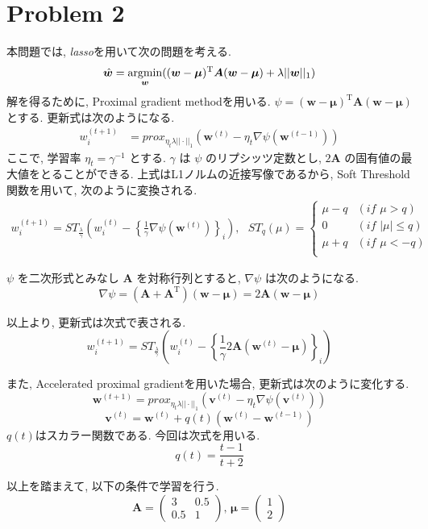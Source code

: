 \documentclass[a4paper,10pt]{jsarticle}
\newcommand{\argmin}{\mathop{\rm argmin}\limits}
\begin{document}
\section*{Problem 2}
本問題では, \textit{lasso}を用いて次の問題を考える.
\[
 \hat{\bm{w}} = \argmin_{\bm{w}}((\bm{w}-\bm{\mu})^\mathrm{T}\bm{A}(\bm{w}-\bm{\mu})
 + \lambda||\bm{w}||_1)
\]
解を得るために, Proximal gradient methodを用いる.
$\psi = (\bm{w}-\bm{\mu})^\mathrm{T}\bm{A}(\bm{w}-\bm{\mu})$ とする.
更新式は次のようになる.
\begin{align*}
 w^{(t+1)}_i
 &= prox_{\eta_t\lambda||\cdot||_1}\left(\bm{w}^{(t)}
 - \eta_t\nabla\psi(\bm{w}^{(t-1)})\right)
\end{align*}
ここで, 学習率 $\eta_t=\gamma^{-1}$ とする.
$\gamma$ は $\psi$ のリプシッツ定数とし, $2\bm{A}$ の固有値の最大値をとることができる.
上式はL1ノルムの近接写像であるから, Soft Threshold関数を用いて, 次のように変換される.
\begin{align*}
 w^{(t+1)}_i
 = ST_{\frac{\lambda}{\gamma}}\left(w^{(t)}_i
 -\left\{\frac{1}{\gamma}\nabla\psi(\bm{w}^{(t)})\right\}_i\right),
 \,\,\,\,
 ST_q(\mu) = \begin{cases}
              \mu - q &(\mathit{if} \,\, \mu > q)\\
              0 &(\mathit{if} \,\, |\mu| \leq q)\\
              \mu + q &(\mathit{if} \,\, \mu < -q)\\
             \end{cases}
\end{align*}

$\psi$ を二次形式とみなし $\bm{A}$ を対称行列とすると, $\nabla \psi$ は次のようになる.
\[
 \nabla \psi = (\bm{A} + \bm{A}^\mathrm{T})(\bm{w} - \bm{\mu}) = 2\bm{A}(\bm{w} - \bm{\mu})
\]

以上より, 更新式は次式で表される.
\[
 w^{(t+1)}_i
 = ST_{\frac{\lambda}{\gamma}}\left(w^{(t)}_i
 -\left\{\frac{1}{\gamma}2\bm{A}(\bm{w}^{(t)} - \bm{\mu})\right\}_i\right)
\]

また, Accelerated proximal gradientを用いた場合, 更新式は次のように変化する.
\[
  \bm{w}^{(t+1)} = prox_{\eta_t\lambda||\cdot||_1}\left(
 \bm{v}^{(t)} - \eta_t\nabla\psi(\bm{v}^{(t)})\right)
\]
\[ \bm{v}^{(t)} = \bm{w}^{(t)} + q(t)(\bm{w}^{(t)} - \bm{w}^{(t-1)}) \]
$q(t)$はスカラー関数である. 今回は次式を用いる.
\[ q(t) = \frac{t-1}{t+2} \]

以上を踏まえて, 以下の条件で学習を行う.
\[
 \bm{A} = \left(\begin{array}{cc} 3 & 0.5 \\ 0.5 & 1 \end{array}\right), \,
 \bm{\mu} = \left(\begin{array}{c} 1 \\ 2 \end{array}\right)
\]
\end{document}
